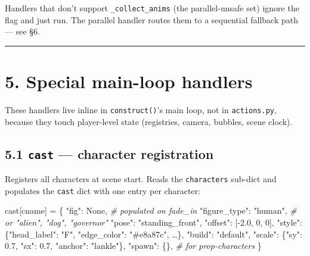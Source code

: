 \documentclass[
  12pt,
  letterpaper,
]{book}
\newenvironment{Shaded}{}{}
\newcommand{\CommentTok}[1]{\textcolor[rgb]{0.38,0.63,0.69}{\textit{#1}}}
\newcommand{\DecValTok}[1]{\textcolor[rgb]{0.25,0.63,0.44}{#1}}
\newcommand{\FloatTok}[1]{\textcolor[rgb]{0.25,0.63,0.44}{#1}}
\newcommand{\NormalTok}[1]{#1}
\newcommand{\OperatorTok}[1]{\textcolor[rgb]{0.40,0.40,0.40}{#1}}
\newcommand{\StringTok}[1]{\textcolor[rgb]{0.25,0.44,0.63}{#1}}
\newcommand{\VariableTok}[1]{\textcolor[rgb]{0.10,0.09,0.49}{#1}}
\begin{document}
Handlers that don't support \texttt{\_collect\_anims} (the
parallel-unsafe set) ignore the flag and just run. The parallel handler
routes them to a sequential fallback path --- see §6.

\begin{center}\rule{0.5\linewidth}{0.5pt}\end{center}

\section{5. Special main-loop
handlers}\label{special-main-loop-handlers}

These handlers live inline in \texttt{construct()}'s main loop, not in
\texttt{actions.py}, because they touch player-level state (registries,
camera, bubbles, scene clock).

\subsection{\texorpdfstring{5.1 \texttt{cast} --- character
registration}{5.1 cast --- character registration}}\label{cast-character-registration}

Registers all characters at scene start. Reads the \texttt{characters}
sub-dict and populates the \texttt{cast} dict with one entry per
character:

\begin{Shaded}
\begin{Highlighting}[]
\NormalTok{cast[cname] }\OperatorTok{=}\NormalTok{ \{}
    \StringTok{"fig"}\NormalTok{:         }\VariableTok{None}\NormalTok{,          }\CommentTok{\# populated on fade\_in}
    \StringTok{"figure\_type"}\NormalTok{: }\StringTok{"human"}\NormalTok{,       }\CommentTok{\# or "alien", "dog", "governor"}
    \StringTok{"pose"}\NormalTok{:        }\StringTok{"standing\_front"}\NormalTok{,}
    \StringTok{"offset"}\NormalTok{:      [}\OperatorTok{{-}}\FloatTok{2.0}\NormalTok{, }\DecValTok{0}\NormalTok{, }\DecValTok{0}\NormalTok{],}
    \StringTok{"style"}\NormalTok{:       \{}\StringTok{"head\_label"}\NormalTok{: }\StringTok{"F"}\NormalTok{, }\StringTok{"edge\_color"}\NormalTok{: }\StringTok{"\#e8a87c"}\NormalTok{, …\},}
    \StringTok{"build"}\NormalTok{:       }\StringTok{"default"}\NormalTok{,}
    \StringTok{"scale"}\NormalTok{:       \{}\StringTok{"sy"}\NormalTok{: }\FloatTok{0.7}\NormalTok{, }\StringTok{"sx"}\NormalTok{: }\FloatTok{0.7}\NormalTok{, }\StringTok{"anchor"}\NormalTok{: }\StringTok{"lankle"}\NormalTok{\},}
    \StringTok{"spawn"}\NormalTok{:       \{\},            }\CommentTok{\# for prop{-}characters}
\NormalTok{\}}
\end{Highlighting}
\end{Shaded}
\end{document}
